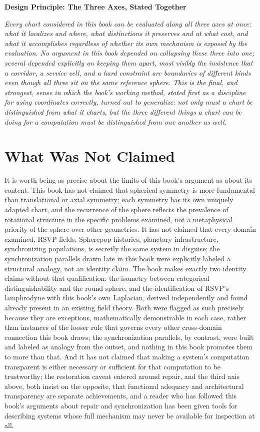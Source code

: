 \documentclass[11pt,fleqn]{book}
\numberwithin{equation}{chapter}
\newenvironment{principle}[1]
  {\begin{principleEnv}
   \noindent\textbf{Design Principle: #1}\par\smallskip\itshape}
  {\end{principleEnv}}
\theoremstyle{plain}
\theoremstyle{definition}
\theoremstyle{remark}
\begin{document}
\begin{principle}{The Three Axes, Stated Together}
Every chart considered in this book can be evaluated along all three axes at once: what it localizes and where, what distinctions it preserves and at what cost, and what it accomplishes regardless of whether its own mechanism is exposed by the evaluation. No argument in this book depended on collapsing these three into one; several depended explicitly on keeping them apart, most visibly the insistence that a corridor, a service cell, and a hard constraint are boundaries of different kinds even though all three sit on the same reference sphere. This is the final, and strongest, sense in which the book's working method, stated first as a discipline for using coordinates correctly, turned out to generalize: not only must a chart be distinguished from what it charts, but the three different things a chart can be doing for a computation must be distinguished from one another as well.
\end{principle}

\section{What Was Not Claimed}

It is worth being as precise about the limits of this book's argument as about its content. This book has not claimed that spherical symmetry is more fundamental than translational or axial symmetry; each symmetry has its own uniquely adapted chart, and the recurrence of the sphere reflects the prevalence of rotational structure in the specific problems examined, not a metaphysical priority of the sphere over other geometries. It has not claimed that every domain examined, RSVP fields, Spherepop histories, planetary infrastructure, synchronizing populations, is secretly the same system in disguise; the synchronization parallels drawn late in this book were explicitly labeled a structural analogy, not an identity claim. The book makes exactly two identity claims without that qualification: the isometry between categorical distinguishability and the round sphere, and the identification of RSVP's lamphrodyne with this book's own Laplacian, derived independently and found already present in an existing field theory. Both were flagged as such precisely because they are exceptions, mathematically demonstrable in each case, rather than instances of the looser rule that governs every other cross-domain connection this book draws; the synchronization parallels, by contrast, were built and labeled as analogy from the outset, and nothing in this book promotes them to more than that. And it has not claimed that making a system's computation transparent is either necessary or sufficient for that computation to be trustworthy; the restoration caveat entered around repair, and the third axis above, both insist on the opposite, that functional adequacy and architectural transparency are separate achievements, and a reader who has followed this book's arguments about repair and synchronization has been given tools for describing systems whose full mechanism may never be available for inspection at all.
\end{document}
